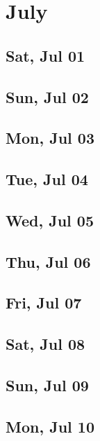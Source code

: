 \chapter{July}
	\section{Sat, Jul 01}
		
	\section{Sun, Jul 02}
		
	\section{Mon, Jul 03}
		
	\section{Tue, Jul 04}
		
	\section{Wed, Jul 05}
		
	\section{Thu, Jul 06}
		
	\section{Fri, Jul 07}
		
	\section{Sat, Jul 08}
		
	\section{Sun, Jul 09}
		
	\section{Mon, Jul 10}
		
